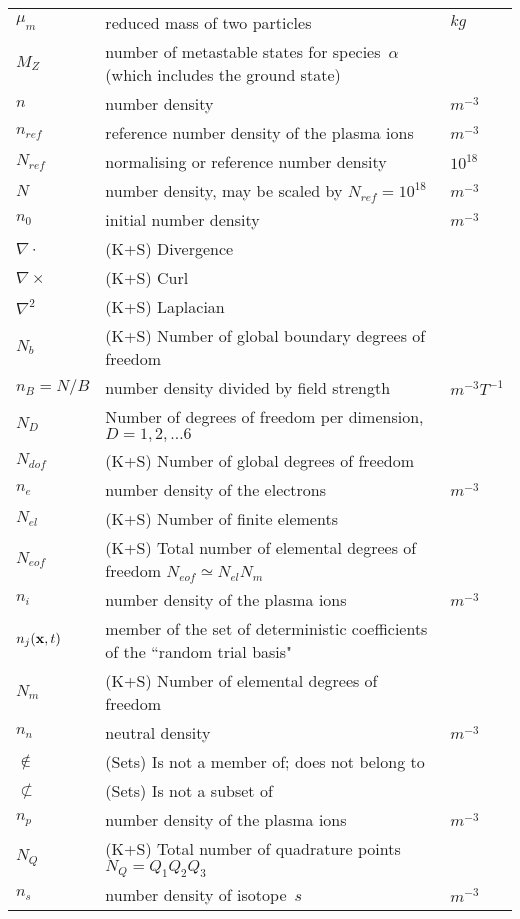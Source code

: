 \begin{longtable}{|p{3.0cm}|p{10.0cm}|p{3.0cm}|}
$\mu_m$ & reduced mass of two particles & $kg$ \\
$M_Z$ & number of metastable states for species~$\alpha$ (which includes the ground state) & \\
$n$ & number density & $m^{-3}$ \\
$n_{ref}$ & reference number density of the plasma ions & $m^{-3}$ \\
$N_{ref} $ & normalising or reference number density & $10^{18}$  \\
$N$ & number density, may be scaled by $N_{ref}=10^{18}$ & $m^{-3}$ \\
$n_0$ & initial number density & $m^{-3}$ \\
$\nabla \cdot$ &  (K+S) Divergence & \\
$\nabla \times$ &  (K+S) Curl & \\
$\nabla^2$ &  (K+S) Laplacian & \\
$N_{b}$ &  (K+S) Number of global boundary degrees of freedom & \\
$n_B=N/B$ & number density divided by field strength & $m^{-3}T^{-1}$ \\
$N_D$ &  Number of degrees of freedom per dimension, $D=1,2,\ldots6$ & \\
$N_{dof}$ &  (K+S) Number of global degrees of freedom & \\
$n_e$ & number density of the electrons & $m^{-3}$ \\
$N_{el}$ &  (K+S) Number of finite elements & \\
$N_{eof}$ &  (K+S) Total number of elemental degrees of freedom $N_{eof} \simeq N_{el}N_m$ & \\
$n_i$ & number density of the plasma ions & $m^{-3}$ \\
$n_j({\bf x},t)$ & member of the set of deterministic coefficients of the ``random trial basis" & \\
$N_{m}$ &  (K+S) Number of elemental degrees of freedom & \\
$n_n$ & neutral density & $m^{-3}$ \\
$\notin$ &  (Sets) Is not a member of; does not belong to & \\
$\not\subset$ &  (Sets) Is not a subset of & \\
$n_p$ & number density of the plasma ions & $m^{-3}$ \\
$N_{Q}$ &  (K+S) Total number of quadrature points $N_Q = Q_1 Q_2 Q_3$ & \\
$n_s$ & number density of isotope~$s$ & $m^{-3}$ \\

\end{longtable}
